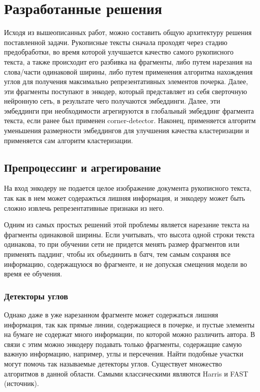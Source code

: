 \section{Разработанные решения}
    Исходя из вышеописанных работ, можно составить общую архитектуру решения поставленной задачи. Рукописные тексты сначала проходят через стадию предобработки, во время которой улучшается качество самого рукописного текста, а также происходит его разбивка на фрагменты, либо путем нарезания на слова/части одинаковой ширины, либо путем применения алгоритма нахождения углов для получения максимально репрезентативных элементов почерка.
    Далее, эти фрагменты поступают в энкодер, который представляет из себя сверточную нейронную сеть, в результате чего получаются эмбеддинги. Далее, эти эмбеддинги при необходимости агрегируются в глобальный эмбеддинг фрагмента текста, если ранее был применен corner-detector. Наконец, применяется алгоритм уменьшения размерности эмбеддингов для улучшения качества кластеризации и применяется сам алгоритм кластеризации.

\subsection{Препроцессинг и агрегирование}

    На вход энкодеру не подается целое изображение документа рукописного текста, так как в нем может содеражться лишняя информация, и энкодеру может быть сложно извлечь репрезентативные признаки из него.

    Одним из самых простых решений этой проблемы является нарезание текста на фрагменты одинаковой ширины. Если учитывать, что высота одной строки текста одинакова, то при обучении сети не придется менять размер фрагментов или применять паддинг, чтобы их объединить в батч, тем самым сохраняя все информацию, содержащуюся во фрагменте, и не допуская смещения модели во время ее обучения. 

\subsubsection{Детекторы углов}

    Однако даже в уже нарезанном фрагменте может содержаться лишняя информация, так как прямые линии, содержащиеся в почерке, и пустые элементы на бумаге не содержат много информации, по которой можно различить автора. В связи с этим можно энкодеру подавать только фрагменты, содержащие самую важную информацию, например, углы и персечения. Найти подобные участки могут помочь так называемые детекторы углов. Существует множество алгоритмов в данной области. Самыми классическими являются Harris и FAST (источник).

